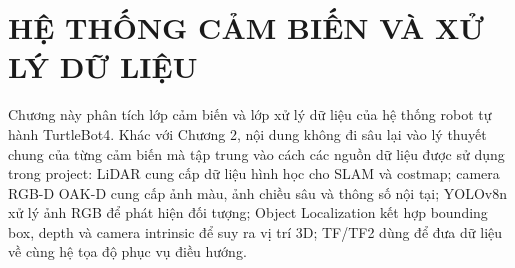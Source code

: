 \providecommand{\placeholderfigure}[3]{%
    \begin{figure}[H]
        \centering
        \fbox{%
            \parbox[c][4.0cm][c]{0.88\textwidth}{%
                \centering
                \textit{#1}%
            }%
        }
        \caption{#2}
        \label{#3}
    \end{figure}
}

\section{HỆ THỐNG CẢM BIẾN VÀ XỬ LÝ DỮ LIỆU}
\label{sec:sensor-data-processing}

Chương này phân tích lớp cảm biến và lớp xử lý dữ liệu của hệ thống robot tự hành TurtleBot4. Khác với Chương 2, nội dung không đi sâu lại vào lý thuyết chung của từng cảm biến mà tập trung vào cách các nguồn dữ liệu được sử dụng trong project: LiDAR cung cấp dữ liệu hình học cho SLAM và costmap; camera RGB-D OAK-D cung cấp ảnh màu, ảnh chiều sâu và thông số nội tại; YOLOv8n xử lý ảnh RGB để phát hiện đối tượng; Object Localization kết hợp bounding box, depth và camera intrinsic để suy ra vị trí 3D; TF/TF2 dùng để đưa dữ liệu về cùng hệ tọa độ phục vụ điều hướng.

